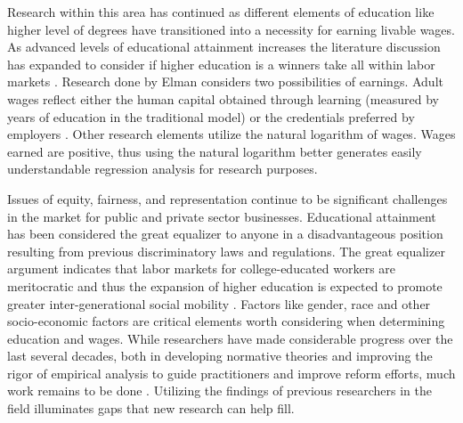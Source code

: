 \documentclass[12pt, English]{article}
\begin{document}
Research within this area has continued as different elements of education like higher level of degrees have transitioned into a necessity for earning livable wages. As advanced levels of educational attainment increases the literature discussion has expanded to consider if higher education is a winners take all within labor markets \citep{elman2004race}. Research done by Elman considers two possibilities of earnings. Adult wages reflect either the human capital obtained through learning (measured by years of education
in the traditional model) or the credentials preferred by employers \citep{elman2004race}. Other research elements utilize the natural logarithm of wages. Wages earned are positive, thus using the natural logarithm better generates easily understandable regression analysis for research purposes. 

Issues of equity, fairness, and representation continue to be significant challenges in the market for public and private sector businesses. Educational attainment has been considered the great equalizer to anyone in a disadvantageous position resulting from previous discriminatory laws and regulations. The great equalizer argument indicates that labor markets for college-educated workers are meritocratic and thus the expansion of higher education is expected to promote greater inter-generational social mobility \citep{long2010changes}. Factors like gender, race and other socio-economic factors are critical elements worth considering when determining education and wages. While researchers have made considerable progress over the last several decades, both in developing normative theories and improving the rigor of empirical analysis to guide practitioners and improve reform efforts, much work remains to be done \citep{rabovsky2018exploring}. Utilizing the findings of previous researchers in the field illuminates gaps that new research can help fill. 
\end{document}
